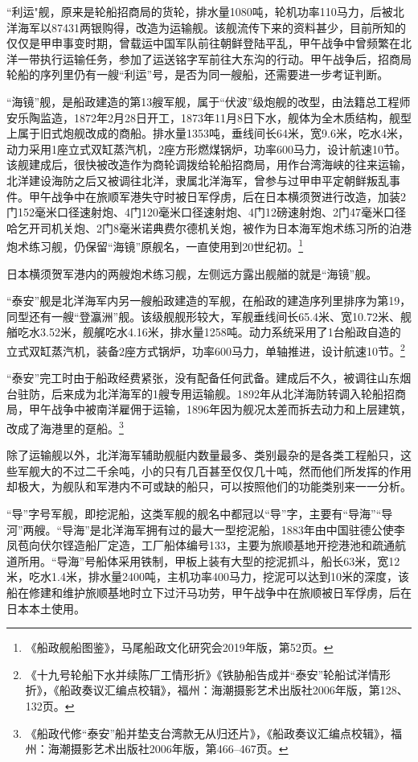 \documentclass[12pt,UTF8]{ctexbook}
\begin{document}
“利运"舰，原来是轮船招商局的货轮，排水量1080吨，轮机功率110马力，后被北洋海军以87431两银购得，改造为运输舰。该舰流传下来的资料甚少，目前所知的仅仅是甲申事变时期，曾载运中国军队前往朝鲜登陆平乱，甲午战争中曾频繁在北洋一带执行运输任务，参加了运送铭字军前往大东沟的行动。甲午战争后，招商局轮船的序列里仍有一艘“利运”号，是否为同一艘船，还需要进一步考证判断。

“海镜”舰，是船政建造的第13艘军舰，属于“伏波”级炮舰的改型，由法籍总工程师安乐陶监造，1872年2月28日开工，1873年11月8日下水，舰体为全木质结构，舰型上属于旧式炮舰改成的商船。排水量1353吨，垂线间长64米，宽9.6米，吃水4米，动力采用1座立式双缸蒸汽机，2座方形燃煤锅炉，功率600马力，设计航速10节。该舰建成后，很快被改造作为商轮调拨给轮船招商局，用作台湾海峡的往来运输，北洋建设海防之后又被调往北洋，隶属北洋海军，曾参与过甲申平定朝鲜叛乱事件。甲午战争中在旅顺军港失守时被日军俘虏，后在日本横须贺进行改造，加装2门152毫米口径速射炮、4门120毫米口径速射炮、4门12磅速射炮、2门47毫米口径哈乞开司机关炮、2门8毫米诺典费尔德机关炮，被作为日本海军炮术练习所的泊港炮术练习舰，仍保留“海镜”原舰名，一直使用到20世纪初。\footnote{《船政舰船图鉴》，马尾船政文化研究会2019年版，第52页。}

日本横须贺军港内的两艘炮术练习舰，左侧远方露出舰艏的就是“海镜”舰。

“泰安”舰是北洋海军内另一艘船政建造的军舰，在船政的建造序列里排序为第19，同型还有一艘“登瀛洲”舰。该级舰舰形较大，军舰垂线间长65.4米、宽10.72米、舰艏吃水3.52米，舰艉吃水4.16米，排水量1258吨。动力系统采用了1台船政自造的立式双缸蒸汽机，装备2座方式锅炉，功率600马力，单轴推进，设计航速10节。\footnote{《十九号轮船下水并续陈厂工情形折》《铁胁船告成并“泰安”轮船试洋情形折》，《船政奏议汇编点校辑》，福州：海潮摄影艺术出版社2006年版，第128、132页。}

“泰安”完工时由于船政经费紧张，没有配备任何武备。建成后不久，被调往山东烟台驻防，后来成为北洋海军的1艘专用运输舰。1892年从北洋海防转调入轮船招商局，甲午战争中被南洋雇佣于运输，1896年因为舰况太差而拆去动力和上层建筑，改成了海港里的趸船。\footnote{《船政代修“泰安”船并垫支台湾款无从归还片》，《船政奏议汇编点校辑》，福州：海潮摄影艺术出版社2006年版，第466--467页。}

除了运输舰以外，北洋海军辅助舰艇内数量最多、类别最杂的是各类工程船只，这些军舰大的不过二千余吨，小的只有几百甚至仅仅几十吨，然而他们所发挥的作用却极大，为舰队和军港内不可或缺的船只，可以按照他们的功能类别来一一分析。

“导”字号军舰，即挖泥船，这类军舰的舰名中都冠以“导”字，主要有“导海”“导河”两艘。“导海”是北洋海军拥有过的最大一型挖泥船，1883年由中国驻德公使李凤苞向伏尔铿造船厂定造，工厂船体编号133，主要为旅顺基地开挖港池和疏通航道所用。“导海”号船体采用铁制，甲板上装有大型的挖泥抓斗，船长63米，宽12米，吃水1.4米，排水量2400吨，主机功率400马力，挖泥可以达到10米的深度，该船在修建和维护旅顺基地时立下过汗马功劳，甲午战争中在旅顺被日军俘虏，后在日本本土使用。
\end{document}
